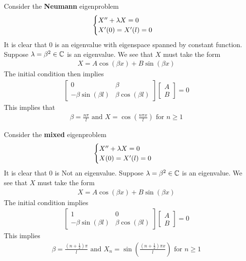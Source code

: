 \documentclass{report}
\begin{document}
\begin{mdframed}
  Consider the \textbf{Neumann} eigenproblem 
\begin{align*}
\begin{cases}
  X'' + \lambda X=0 \\
  X'(0)=X'(l)=0
\end{cases}
\end{align*}
It is clear that $0$ is an eigenvalue with eigenspace spanned by constant function. Suppose $\lambda =\beta ^2\in\mathbb{C}$ is an eigenvalue. We see that $X$ must take the form 
 \begin{align*}
X= A\cos (\beta x) + B\sin (\beta x)
\end{align*}
The initial condition then implies 
\begin{align*}
\begin{bmatrix}
  0 & \beta \\
  -\beta  \sin (\beta l) & \beta  \cos (\beta l)
\end{bmatrix}\begin{bmatrix}
A\\
B
\end{bmatrix}=0 
\end{align*}
This implies that 
\begin{align*}
\beta = \frac{n \pi  }{l} \text{ and }X= \cos (\frac{n \pi  x}{l})\text{ for }n\geq 1
\end{align*}
\end{mdframed}
\begin{mdframed}
Consider the \textbf{mixed} eigenproblem 
\begin{align*}
\begin{cases}
  X''+ \lambda  X=0 \\
  X(0)=X'(l)=0
\end{cases}
\end{align*}
It is clear that $0$ is Not an eigenvalue. Suppose $\lambda = \beta ^2\in\mathbb{C}$ is an eigenvalue. We see that $X$ must take the form 
 \begin{align*}
X=A \cos (\beta x)+ B \sin (\beta x)
\end{align*}
The initial condition implies 
\begin{align*}
\begin{bmatrix}
  1 & 0 \\
  -\beta  \sin (\beta l) & \beta \cos (\beta l) 
\end{bmatrix} \begin{bmatrix}
A \\
B
\end{bmatrix}=0 
\end{align*}
This implies
\begin{align*}
\beta = \frac{(n+ \frac{1}{2})\pi }{l}\text{ and }X_n= \sin (\frac{(n+ \frac{1}{2})\pi  x}{l})\text{ for }n\geq 1
\end{align*}
\end{mdframed}
\end{document}
